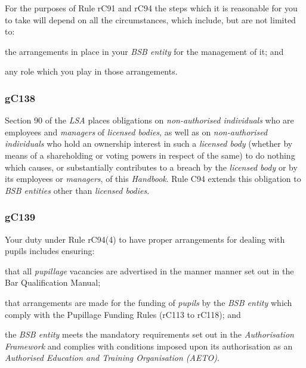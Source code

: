 For the purposes of Rule rC91 and rC94 the steps which it is reasonable
for you to take will depend on all the circumstances, which include, but
are not limited to:
\begin{numlist}\item the arrangements in place in your \emph{BSB entity} for the
management of it; and
\item any role which you play in those arrangements.

\end{numlist}


\subsubsection{\color{darkgrey}gC138}

Section 90 of the \emph{LSA} places obligations on \emph{non-authorised
individuals} who are employees and \emph{managers} of \emph{licensed
bodies}, as well as on \emph{non-authorised individuals} who hold an
ownership interest in such a \emph{licensed body} (whether by means of a
shareholding or voting powers in respect of the same) to do nothing
which causes, or substantially contributes to a breach by the
\emph{licensed body} or by its employees or \emph{managers}, of this
\emph{Handbook}. Rule C94 extends this obligation to \emph{BSB entities}
other than \emph{licensed bodies}.

\subsubsection{\color{darkgrey}gC139}

Your duty under Rule rC94(4) to have proper arrangements for dealing with
pupils includes ensuring:
\begin{numlist}
\item that all \emph{pupillage} vacancies are advertised in the manner
manner set out in the Bar Qualification Manual;

\item that arrangements are made for the funding of \emph{pupils} by the
\emph{BSB entity} which comply with the Pupillage Funding Rules (rC113
to rC118); and

\item the \emph{BSB entity} meets the mandatory requirements set out in the
\emph{Authorisation Framework} and complies with conditions imposed upon
its authorisation as an \emph{Authorised Education and Training
Organisation (AETO)}.\end{numlist}

